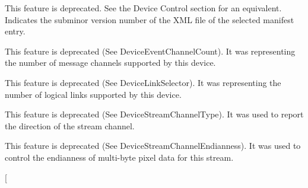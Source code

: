 \begin{DoxyRefList}
\item[\label{deprecated__deprecated000089}%
\hypertarget{deprecated__deprecated000089}{}%
成员 \hyperlink{classmv_i_m_p_a_c_t_1_1acquire_1_1_gen_i_cam_1_1_transport_layer_control_aaf30f52128519238a83f09ca514fd246}{mv\+I\+M\+P\+A\+C\+T\+:\+:acquire\+:\+:Gen\+I\+Cam\+:\+:Transport\+Layer\+Control\+:\+:gev\+Manifest\+X\+M\+L\+Sub\+Minor\+Version} ]This feature is deprecated. See the Device Control section for an equivalent. Indicates the subminor version number of the X\+M\+L file of the selected manifest entry.  
\item[\label{deprecated__deprecated000068}%
\hypertarget{deprecated__deprecated000068}{}%
成员 \hyperlink{classmv_i_m_p_a_c_t_1_1acquire_1_1_gen_i_cam_1_1_transport_layer_control_af689a7e45d74fa1d376432ab51f8784a}{mv\+I\+M\+P\+A\+C\+T\+:\+:acquire\+:\+:Gen\+I\+Cam\+:\+:Transport\+Layer\+Control\+:\+:gev\+Message\+Channel\+Count} ]This feature is deprecated (See Device\+Event\+Channel\+Count). It was representing the number of message channels supported by this device.  
\item[\label{deprecated__deprecated000067}%
\hypertarget{deprecated__deprecated000067}{}%
成员 \hyperlink{classmv_i_m_p_a_c_t_1_1acquire_1_1_gen_i_cam_1_1_transport_layer_control_ace62c05c2965a8a3d57157051b0f3174}{mv\+I\+M\+P\+A\+C\+T\+:\+:acquire\+:\+:Gen\+I\+Cam\+:\+:Transport\+Layer\+Control\+:\+:gev\+Number\+Of\+Interfaces} ]This feature is deprecated (See Device\+Link\+Selector). It was representing the number of logical links supported by this device.  
\item[\label{deprecated__deprecated000084}%
\hypertarget{deprecated__deprecated000084}{}%
成员 \hyperlink{classmv_i_m_p_a_c_t_1_1acquire_1_1_gen_i_cam_1_1_transport_layer_control_a01418fdc96130e97491eadf9fa865767}{mv\+I\+M\+P\+A\+C\+T\+:\+:acquire\+:\+:Gen\+I\+Cam\+:\+:Transport\+Layer\+Control\+:\+:gev\+S\+C\+P\+Direction} ]This feature is deprecated (See Device\+Stream\+Channel\+Type). It was used to report the direction of the stream channel. 
\item[\label{deprecated__deprecated000085}%
\hypertarget{deprecated__deprecated000085}{}%
成员 \hyperlink{classmv_i_m_p_a_c_t_1_1acquire_1_1_gen_i_cam_1_1_transport_layer_control_afce4d838f778e9d0f3459231c0284b2f}{mv\+I\+M\+P\+A\+C\+T\+:\+:acquire\+:\+:Gen\+I\+Cam\+:\+:Transport\+Layer\+Control\+:\+:gev\+S\+C\+P\+S\+Big\+Endian} ]This feature is deprecated (See Device\+Stream\+Channel\+Endianness). It was used to control the endianness of multi-\/byte pixel data for this stream.  
\item[\label{deprecated__deprecated000069}%

\end{DoxyRefList}
